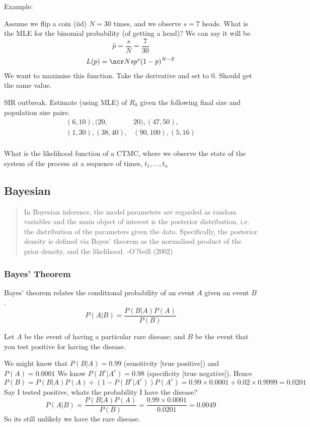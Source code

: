 \documentclass{/home/janmebows/Documents/LatexTemplates/myassignment}
\begin{document}
Example:

Assume we flip a coin (iid) $N=30$ times, and we observe $s=7$ heads. What is the MLE for the binomial probability (of getting a head)?
We can say it will be
\[\hat{p} = \frac s N = \frac7{30}\]
\begin{align*}
    L(p) = \ncr Ns p^s (1-p)^{N-S}\\    
\end{align*}
We want to maximise this function. Take the derivative and set to $0$. Should get the same value.


SIR outbreak. Estimate (using MLE) of $R_0$ given the following final size and population size pairs:
\begin{align*}
    (6,10), (20,&20), (47,50),\\
    (1,30), (38,40), & (90,100), (5,16)\\
\end{align*}




What is the likelihood function of a CTMC, where we observe the state of the system of the process at a sequence of times, $t_1,\ldots,t_n$


\subsection{Bayesian}
\begin{verse}
\noindent
{\centering
In Bayesian inference, the model parameters are regarded as random variables and the main object of interest is the posterior distribution, i.e. the distribution of the parameters given the data. Specifically, the posterior density is defined via Bayes' theorem as the normalised product of the prior density, and the likelihood.
-O'Neill (2002)
}
\end{verse}

\subsubsection{Bayes' Theorem}
Bayes' theorem relates the conditional probability of an event $A$ given an event $B$.
\[P(A|B) = \frac{P(B|A)P(A)}{P(B)}\]

Let $A$ be the event of having a particular rare disease; and $B$ be the event that you test positive for having the disease.


We might know that $P(B|A) = 0.99$ (sensitivity [true positive]) and $P(A) = 0.0001$ 
We know $P(B^c | A^c) = 0.98$ (specificity [true negative]).
Hence
\[P(B) = P(B|A) P(A) + (1-P(B^c|A^c))P(A^c) = 0.99 \times 0.0001 + 0.02 \times 0.9999 = 0.0201\]
Say I tested positive, whats the probability I have the disease?
\[P(A|B) = \frac{P(B|A)P(A)}{P(B)} = \frac{0.99\times 0.0001}{0.0201} = 0.0049\]
So its still unlikely we have the rare disease.
\end{document}

